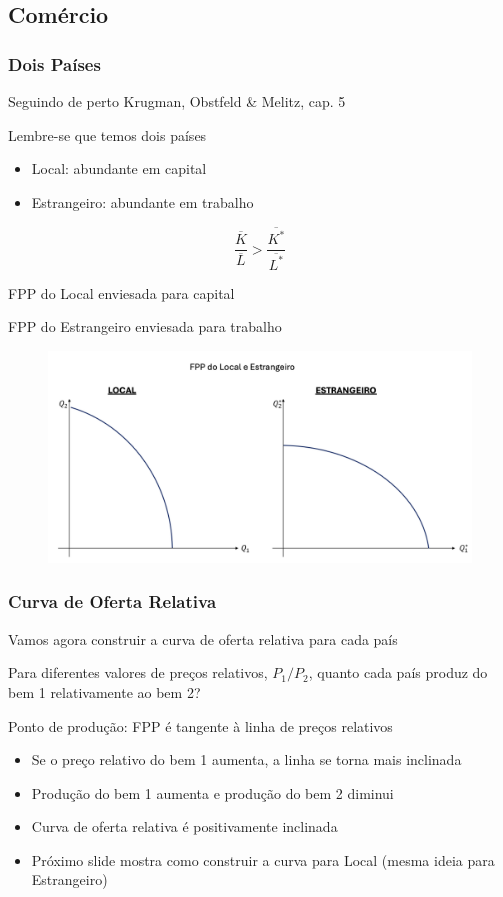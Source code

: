 \documentclass[a4paper,12pt]{article}[abntex2]
\begin{document}
\subsection{\textbf{Comércio}}
\subsubsection{\textbf{Dois Países}}
Seguindo de perto Krugman, Obstfeld \& Melitz, cap. 5

Lembre-se que temos dois países
\begin{itemize}
    \item Local: abundante em capital
    \item Estrangeiro: abundante em trabalho
\end{itemize}

\[
\frac{\overline{K}}{\overline{L}} > \frac{\overline{K^*}}{\overline{L^*}}
\]

FPP do Local enviesada para capital

FPP do Estrangeiro enviesada para trabalho

\begin{figure}[H]
    \centering
    \includegraphics[width=0.7\linewidth]{Imagens/a12i6.png}
\end{figure}

\subsubsection{\textbf{Curva de Oferta Relativa}}

Vamos agora construir a curva de oferta relativa para cada país

Para diferentes valores de preços relativos, \( P_1 / P_2 \), quanto cada país produz do bem 1 relativamente ao bem 2?

Ponto de produção: FPP é tangente à linha de preços relativos
\begin{itemize}
    \item Se o preço relativo do bem 1 aumenta, a linha se torna mais inclinada
    \item Produção do bem 1 aumenta e produção do bem 2 diminui
    \item Curva de oferta relativa é positivamente inclinada
    \item Próximo slide mostra como construir a curva para Local (mesma ideia para Estrangeiro)
\end{itemize}
\end{document}
